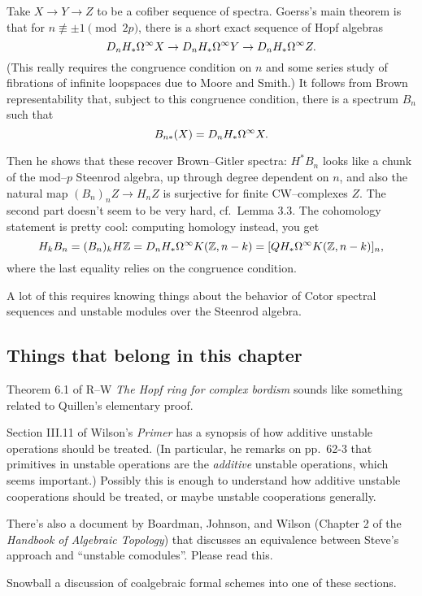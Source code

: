 Take $X \to Y \to Z$ to be a cofiber sequence of spectra.  Goerss's main theorem is that for $n \not\equiv \pm 1 \pmod{2p}$, there is a short exact sequence of Hopf algebras \[D_n H_* \Omega^\infty X \to D_n H_* \Omega^\infty Y \to D_n H_* \Omega^\infty Z.\]  (This really requires the congruence condition on $n$ and some series study of fibrations of infinite loopspaces due to Moore and Smith.)  It follows from Brown representability that, subject to this congruence condition, there is a spectrum $B_n$ such that \[B_{n*}(X) = D_n H_* \Omega^\infty X.\]

Then he shows that these recover Brown--Gitler spectra: $H^* B_n$ looks like a chunk of the mod--$p$ Steenrod algebra, up through degree dependent on $n$, and also the natural map $(B_n)_n Z \to H_n Z$ is surjective for finite CW--complexes $Z$.  The second part doesn't seem to be very hard, cf.\ Lemma 3.3.  The cohomology statement is pretty cool: computing homology instead, you get \[H_k B_n = (B_n)_k H\mathbb Z = D_n H_* \Omega^\infty K(\mathbb Z, n - k) = [Q H_* \Omega^\infty K(\mathbb Z, n-k)]_n,\] where the last equality relies on the congruence condition.

A lot of this requires knowing things about the behavior of Cotor spectral sequences and unstable modules over the Steenrod algebra.











\subsection*{Things that belong in this chapter}

Theorem 6.1 of R--W \textit{The Hopf ring for complex bordism} sounds like something related to Quillen's elementary proof.

Section III.11 of Wilson's \textit{Primer} has a synopsis of how additive unstable operations should be treated.  (In particular, he remarks on pp.\ 62-3 that primitives in unstable operations are the \emph{additive} unstable operations, which seems important.)  Possibly this is enough to understand how additive unstable cooperations should be treated, or maybe unstable cooperations generally.

There's also a document by Boardman, Johnson, and Wilson (Chapter 2 of the \textit{Handbook of Algebraic Topology}) that discusses an equivalence between Steve's approach and ``unstable comodules''.  Please read this.

Snowball a discussion of coalgebraic formal schemes into one of these sections.





